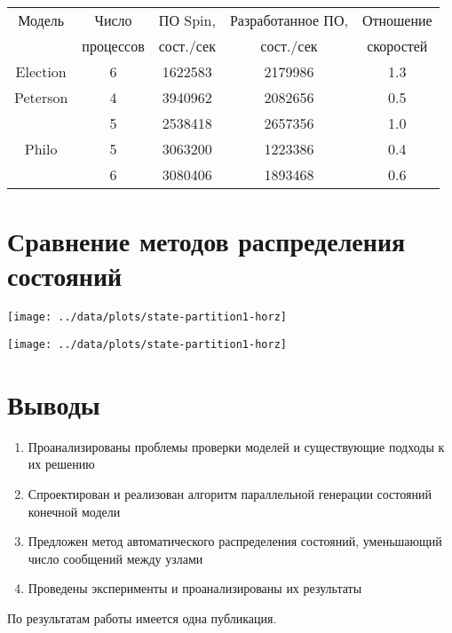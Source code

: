 \documentclass[12pt]{article}
\begin{document}
\begin{tabular}{ccccc}
  \hline
  Модель & Число     & ПО Spin,   & Разработанное ПО, & Отношение \\
  & процессов & сост./сек &  сост./сек         & скоростей \\
  \hline
  Election & 6 & 1622583 & 2179986 & 1.3 \\
  Peterson & 4 & 3940962 & 2082656 & 0.5 \\
   & 5 & 2538418 & 2657356 & 1.0 \\
  Philo & 5 & 3063200 & 1223386 & 0.4 \\
   & 6 & 3080406 & 1893468 & 0.6 \\
  \hline
\end{tabular}

\section{Сравнение методов распределения состояний}
\label{sec:partition-cmp}

\begin{minipage}[m]{0.5\linewidth}
  \texttt{[image: ../data/plots/state-partition1-horz]}  
\end{minipage}
\begin{minipage}[m]{0.5\linewidth}
  \texttt{[image: ../data/plots/state-partition1-horz]}  
\end{minipage}


\section{Выводы}
\label{sec:conclusion}

\small
\begin{enumerate}
\item Проанализированы проблемы проверки моделей и существующие подходы к их решению
\item Спроектирован и реализован алгоритм параллельной генерации состояний конечной
  модели
\item Предложен метод автоматического распределения состояний, уменьшающий число сообщений
  между узлами
\item Проведены эксперименты и проанализированы их результаты
\end{enumerate}

По результатам работы имеется одна публикация.
\end{document}
